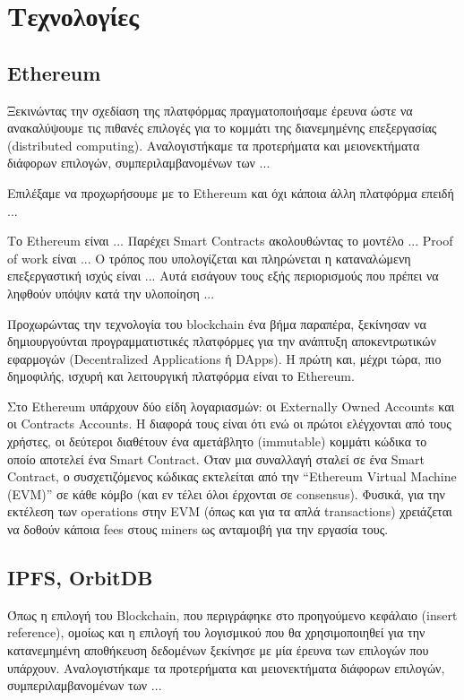 \section{Τεχνολογίες}

\subsection{Ethereum}

Ξεκινώντας την σχεδίαση της πλατφόρμας πραγματοποιήσαμε έρευνα ώστε να ανακαλύψουμε τις πιθανές επιλογές για το κομμάτι της διανεμημένης επεξεργασίας (distributed computing). Αναλογιστήκαμε τα προτερήματα και μειονεκτήματα διάφορων επιλογών, συμπεριλαμβανομένων των ... 

Επιλέξαμε να προχωρήσουμε με το Ethereum και όχι κάποια άλλη πλατφόρμα επειδή ...

Το Ethereum είναι ...
Παρέχει Smart Contracts ακολουθώντας το μοντέλο ...
Proof of work είναι ...
Ο τρόπος που υπολογίζεται και πληρώνεται η καταναλώμενη επεξεργαστική ισχύς είναι ...
Αυτά εισάγουν τους εξής περιορισμούς που πρέπει να ληφθούν υπόψιν κατά την υλοποίηση ...

Προχωρώντας την τεχνολογία του blockchain ένα βήμα παραπέρα, ξεκίνησαν να δημιουργούνται προγραμματιστικές πλατφόρμες για την ανάπτυξη αποκεντρωτικών εφαρμογών (Decentralized Applications ή DApps). Η πρώτη και, μέχρι τώρα, πιο δημοφιλής, ισχυρή και λειτουργική πλατφόρμα είναι το Ethereum.

Στο Ethereum υπάρχουν δύο είδη λογαριασμών: οι Externally Owned Accounts και οι Contracts Accounts. Η διαφορά τους είναι ότι ενώ οι πρώτοι ελέγχονται από τους χρήστες, οι δεύτεροι διαθέτουν ένα αμετάβλητο (immutable) κομμάτι κώδικα το οποίο αποτελεί ένα Smart Contract. Όταν μια συναλλαγή σταλεί σε ένα Smart Contract, ο συσχετιζόμενος κώδικας εκτελείται από την  “Ethereum Virtual Machine (EVM)” σε κάθε κόμβο (και εν τέλει όλοι έρχονται σε consensus). Φυσικά, για την εκτέλεση των operations στην EVM (όπως και για τα απλά transactions) χρειάζεται να δοθούν κάποια fees στους miners ως ανταμοιβή για την εργασία τους.


\subsection{IPFS, OrbitDB}

Όπως η επιλογή του Blockchain, που περιγράφηκε στο προηγούμενο κεφάλαιο (insert reference), ομοίως και η επιλογή του λογισμικού που θα χρησιμοποιηθεί για την κατανεμημένη αποθήκευση δεδομένων ξεκίνησε με μία έρευνα των επιλογών που υπάρχουν. Αναλογιστήκαμε τα προτερήματα και μειονεκτήματα διάφορων επιλογών, συμπεριλαμβανομένων των ... 

